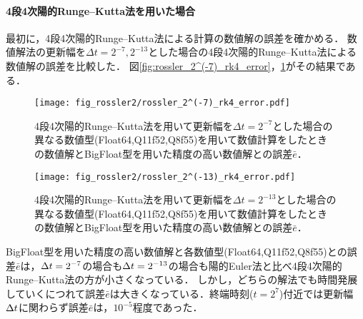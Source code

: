 \paragraph*{4段4次陽的Runge--Kutta法を用いた場合}
最初に，4段4次陽的Runge--Kutta法による計算の数値解の誤差を確かめる．
数値解法の更新幅を$\Delta t = 2^{-7},2^{-13}$とした場合の4段4次陽的Runge--Kutta法による数値解の誤差を比較した．
図\ref{fig:rossler_2^(-7)_rk4_error}，\ref{fig:rossler_2^(-13)_rk4_error}がその結果である．
\begin{figure}[H]
    \centering
    \begin{minipage}[b]{0.48\columnwidth}
        \centering
        \texttt{[image: fig\_rossler2/rossler\_2^(-7)\_rk4\_error.pdf]}
        \caption{4段4次陽的Runge--Kutta法を用いて更新幅を$\Delta t = 2^{-7}$とした場合の異なる数値型(Float64,Q11f52,Q8f55)を用いて数値計算をしたときの数値解とBigFloat型を用いた精度の高い数値解との誤差$\bar{e}$．}
        \label{fig:rossler_2^(-7)_rk4_error}
    \end{minipage}
    \hspace{0.01\columnwidth}
    \begin{minipage}[b]{0.48\columnwidth}
        \centering
        \texttt{[image: fig\_rossler2/rossler\_2^(-13)\_rk4\_error.pdf]}
        \caption{4段4次陽的Runge--Kutta法を用いて更新幅を$\Delta t =  2^{-13}$とした場合の異なる数値型(Float64,Q11f52,Q8f55)を用いて数値計算をしたときの数値解とBigFloat型を用いた精度の高い数値解との誤差$\bar{e}$．}
        \label{fig:rossler_2^(-13)_rk4_error}
    \end{minipage}   
\end{figure}
BigFloat型を用いた精度の高い数値解と各数値型(Float64,Q11f52,Q8f55)との誤差$\bar{e}$は，$\Delta t = 2^{-7}$の場合も$\Delta t = 2^{-13}$の場合も陽的Euler法と比べ4段4次陽的Runge--Kutta法の方が小さくなっている．
しかし，どちらの解法でも時間発展していくにつれて誤差$\bar{e}$は大きくなっている．終端時刻($t=2^7$)付近では更新幅$\Delta t$に関わらず誤差$\bar{e}$は，$10^{-5}$程度であった．



